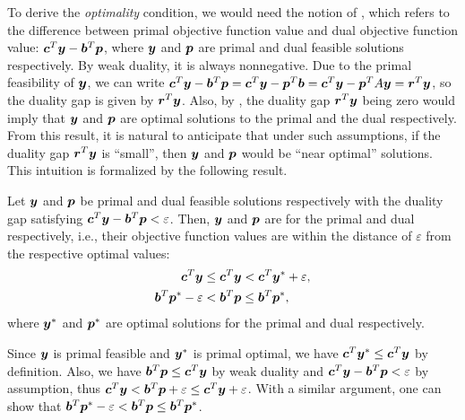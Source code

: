 \begin{enumerate}
To derive the \emph{optimality} condition, we would need the notion of , which refers to the difference between primal objective function value and
dual objective function value: \(\bm{c}^{T}\bm{y}-\bm{b}^{T}\bm{p}\),
where \(\bm{y}\) and \(\bm{p}\) are primal and dual feasible solutions
respectively. By weak duality, it is always nonnegative.  Due to the primal
feasibility of \(\bm{y}\), we can write
\(\bm{c}^{T}\bm{y}-\bm{b}^{T}\bm{p}=\bm{c}^{T}\bm{y}-\bm{p}^{T}\bm{b}=\bm{c}^{T}\bm{y}-\bm{p}^{T}A\bm{y}=\bm{r}^{T}\bm{y}\),
so the duality gap is given by \(\bm{r}^{T}\bm{y}\). Also, by
, the duality gap \(\bm{r}^{T}\bm{y}\) being
zero would imply that \(\bm{y}\) and \(\bm{p}\) are optimal solutions to
the primal and the dual respectively.  From this result, it is natural to
anticipate that under such assumptions, if the duality gap
\(\bm{r}^{T}\bm{y}\) is “small”, then \(\bm{y}\) and \(\bm{p}\)
would be “near optimal” solutions. This intuition is formalized by the
following result.
\begin{proposition}
\label{prp:near-primal-dual-optimal}
Let \(\bm{y}\) and \(\bm{p}\) be primal and dual feasible solutions
respectively with the duality gap satisfying
\(\bm{c}^{T}\bm{y}-\bm{b}^{T}\bm{p}<\varepsilon\). Then, \(\bm{y}\) and \(\bm{p}\) are
 for the primal and dual respectively, i.e.,
their objective function values are within the distance of \(\varepsilon\) from
the respective optimal values:
\begin{align*}
\bm{c}^{T}\bm{y}&\le \bm{c}^{T}\bm{y}<\bm{c}^{T}\bm{y}^{*}+\varepsilon, \\
\bm{b}^{T}\bm{p}^{*}-\varepsilon&<\bm{b}^{T}\bm{p}\le\bm{b}^{T}\bm{p}^{*},
\end{align*}
where \(\bm{y}^{*}\) and \(\bm{p}^{*}\) are optimal solutions for the
primal and dual respectively.
\end{proposition}
\begin{pf}
Since \(\bm{y}\) is primal feasible and \(\bm{y}^{*}\) is primal optimal,
we have \(\bm{c}^{T}\bm{y}^{*}\le\bm{c}^{T}\bm{y}\) by definition.
Also, we have \(\bm{b}^{T}\bm{p}\le\bm{c}^{T}\bm{y}\) by weak duality
and \(\bm{c}^{T}\bm{y}-\bm{b}^{T}\bm{p}<\varepsilon\) by assumption,
thus \(\bm{c}^{T}\bm{y}<\bm{b}^{T}\bm{p}+\varepsilon
\le\bm{c}^{T}\bm{y}+\varepsilon\). With a similar argument, one can show that
\(\bm{b}^{T}\bm{p}^{*}-\varepsilon<\bm{b}^{T}\bm{p}\le\bm{b}^{T}\bm{p}^{*}\).

\end{pf}
\end{enumerate}
